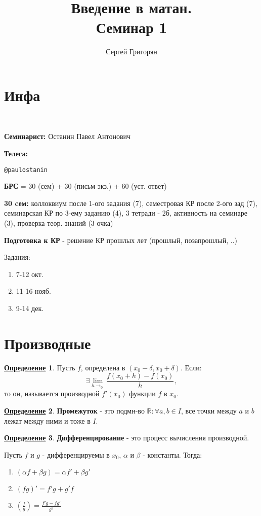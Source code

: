 \documentclass[a4, 12pt]{article}
\title{Введение в матан. \\ Семинар 1}
\author{Сергей Григорян}
\newcommand{\R}{\mathbb{R}}
\theoremstyle{definition}
\newtheorem{definition}{\underline{Определение}}[section]
\begin{document}
\maketitle
\newpage
\section{Инфа}
~\newline

\textbf{Семинарист:} Останин Павел Антонович

\textbf{Телега:} 
\begin{verbatim}
@paulostanin
\end{verbatim}

\textbf{БРС} = 30 (сем) + 30 (письм экз.) + 60 (уст. ответ)

\textbf{30 cем:} коллоквиум после 1-ого задания (7), семестровая КР после 2-ого зад (7), семинарская КР по 3-ему заданию (4), 3 тетради - 2б, активность на семинаре (3), проверка теор. знаний (3 очка)

\textbf{Подготовка к КР} - решение КР прошлых лет (прошлый, позапрошлый, ..)

Задания:
\begin{enumerate}
    \item 7-12 окт.
    \item 11-16 нояб.
    \item 9-14 дек.
\end{enumerate}

\section{Производные}

\begin{definition}
Пусть  $f$, определена в $(x_0 - \delta, x_0 + \delta)$. Если:
\[
\exists \lim_{h\to_0} \frac{f(x_0 + h) - f(x_0)}{h} 
,\] 
то он, называется производной $f'(x_0)$ функции $f$ в $x_0$.
\end{definition}

\begin{definition}
\textbf{Промежуток} - это подмн-во $\R \colon \forall a, b \in I$, все точки между $a$ и $b$ лежат между ними и тоже в $I$.
\end{definition}
\begin{definition}
\textbf{Дифференцирование} - это процесс вычисления производной.
\end{definition}

Пусть $f$ и $g$ - дифференцируемы в $x_0$, $\alpha$ и $\beta$ - константы. Тогда:
\begin{enumerate}
    \item $(\alpha f + \beta g) = \alpha f' + \beta g'$  
    \item $(fg)' = f'g + g'f$
    \item $(\frac{f}{g}) = \frac{f'g - fg'}{g^2}$
\end{enumerate}
\end{document}
